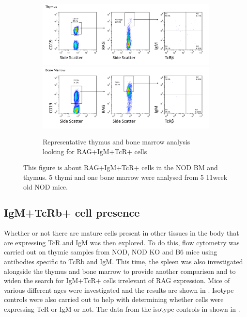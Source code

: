 \begin{figure}
	\begin{subfigure}{\textwidth}
	\includegraphics[width=\textwidth]{Figures/Thy3RAGIgMTcR.png}
	\includegraphics[width=\textwidth]{Figures/BMRAGIgMTcR.png}
	\caption{Representative thymus and bone marrow analysis looking for RAG+IgM+TcR+ cells}
	\label{subfig:BMvThyRAGIgMTcR}
	\end{subfigure}
\caption{This figure is about RAG+IgM+TcR+ cells in the NOD BM and thymus. 5 thymi and one bone marrow were analysed from 5 11week old NOD mice.}
\label{fig:RAGIgMTcRpos}
\end{figure}



\subsection{IgM+TcRb+ cell presence}

Whether or not there are mature cells present in other tissues in the body that are expressing TcR and IgM was then explored.
To do this, flow cytometry was carried out on thymic samples from NOD, NOD KO and B6 mice using antibodies specific to TcRb and IgM.
This time, the spleen was also investigated alongside the thymus and bone marrow to provide another comparison and to widen the search for IgM+TcR+ cells irrelevant of RAG expression.
Mice of various different ages were investigated and the results are shown in  .
Isotype controls were also carried out to help with determining whether cells were expressing TcR or IgM or not.
The data from the isotype controls in shown in .

